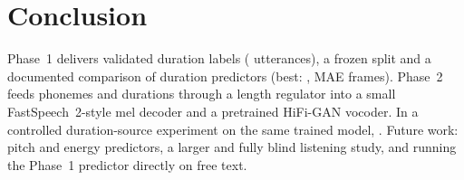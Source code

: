 \section{Conclusion}
Phase~1 delivers validated duration labels (\nKept{} utterances), a frozen split and a documented comparison of duration predictors (best: \bestModel, MAE \maeBest{} frames).
Phase~2 feeds phonemes and durations through a length regulator into a small FastSpeech~2-style mel decoder and a pretrained HiFi-GAN vocoder. In a controlled duration-source experiment on the same trained model, \ptShort{}. Future work: pitch and energy predictors, a larger and fully blind listening study, and running the Phase~1 predictor directly on free text.
